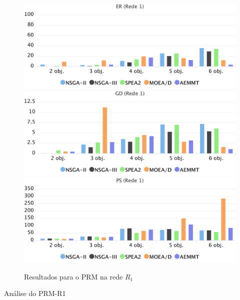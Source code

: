 \begin{figure}[!htbp]
	\caption{Resultados para o PRM na rede $R_1$}
	\label{fig_exp1_mrp_r1}
	\includegraphics[width=1\textwidth]{cap_experimentos/figs/er-mrp-r1}
	\includegraphics[width=1\textwidth]{cap_experimentos/figs/gd-mrp-r1}
	\includegraphics[width=1\textwidth]{cap_experimentos/figs/ps-mrp-r1}
\end{figure}

Análise do PRM-R1

